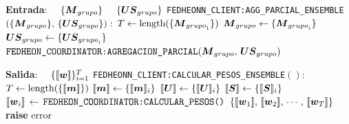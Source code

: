 \documentclass[00-Trabajo_Final.tex]{subfiles}
\begin{document}
\begin{algorithm}[H]
\caption{Pseudocódigo de agregación parcial en coordinador FedHEONN con \textbf{ensamblaje}}
\label{alg:fedcoord_ensemble_aggregate}
\begin{algorithmic}[1]
    \STATE \textbf{Entrada}:
    \STATE $\quad \{\boldsymbol{M}_{grupo}\}$ \hfill {}
    \STATE $\quad \{\boldsymbol{US}_{grupo}\}$ \hfill {}
    \REQUIRE \verb|FEDHEONN_CLIENT:AGG_PARCIAL_ENSEMBLE|$( \{\boldsymbol{M}_{grupo}\},\,\{\boldsymbol{US}_{grupo}\}):$
    \STATE $T \gets \text{length}(\{\boldsymbol{M}_{{grupo}_1}\})$ \hfill {}
        \STATE $\boldsymbol{M}_{grupo} \gets \{\boldsymbol{M}_{{grupo}_i}\}$ \hfill {}
        \STATE $\boldsymbol{US}_{grupo} \gets \{\boldsymbol{US}_{{grupo}_i}\}$
        \STATE $\texttt{FEDHEON\_COORDINATOR:AGREGACION\_PARCIAL}(\boldsymbol{M}_{grupo},\,\boldsymbol{US}_{grupo})$ \hfill {}
    \ENDFOR
\end{algorithmic}
\end{algorithm}


\begin{algorithm}[H]
\caption{Pseudocódigo cálculo pesos óptimos en coord. FedHEONN con \textbf{ensamblaje}}
\label{alg:fedcoord_ensemble_optim}
\begin{algorithmic}[1]
    \STATE \textbf{Salida}:
    \STATE $\quad \{[\![\boldsymbol{w}]\!]\}_{i=1}^{T}$ \hfill {}
    \REQUIRE \verb|FEDHEONN_CLIENT:CALCULAR_PESOS_ENSEMBLE|$():$
        \STATE $T \gets \text{length}(\{[\![\boldsymbol{m}]\!]\})$ \hfill {}
            \STATE $[\![\boldsymbol{m}]\!] \gets \{[\![\boldsymbol{m}]\!]_i\}$ \hfill {}
            \STATE $[\![\boldsymbol{U}]\!] \gets \{[\![\boldsymbol{U}]\!]_i\}$
            \STATE $[\![\boldsymbol{S}]\!] \gets \{[\![\boldsymbol{S}]\!]_i\}$
            \STATE $[\![\boldsymbol{w}_i]\!]\,\gets\,\texttt{FEDHEON\_COORDINATOR:CALCULAR\_PESOS()}$ \hfill {}
        \ENDFOR
        \RETURN $\{[\![\boldsymbol{w}_1]\!],\,[\![\boldsymbol{w}_2]\!],\,\cdots,\,[\![\boldsymbol{w}_T]\!]\}$
    \ELSE
        \STATE \textbf{raise} error  \hfill {}
    \ENDIF
\end{algorithmic}
\end{algorithm}
\end{document}
